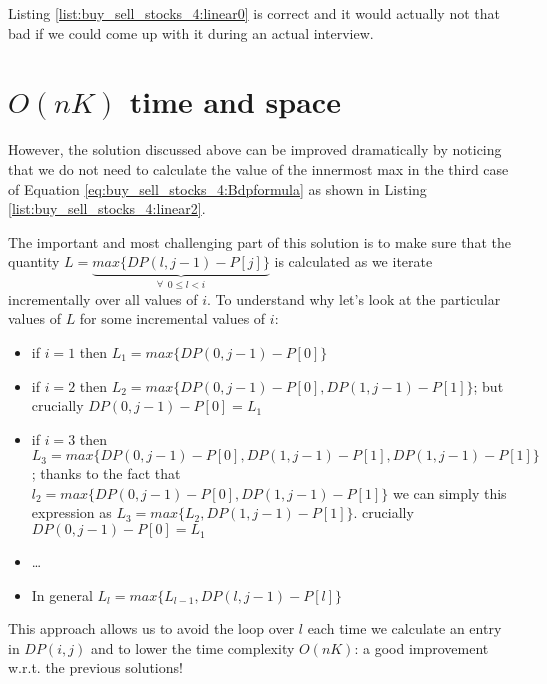 
Listing \ref{list:buy_sell_stocks_4:linear0} is correct and it would actually not that bad if we could come up with it during an actual interview. 

\section{$O(nK)$ time and space}
\label{buy_sell_stocks4:sec:linerartime1}
However, the solution discussed above can be improved dramatically by noticing that we do not need to calculate the value of the innermost max in the third case of Equation \ref{eq:buy_sell_stocks_4:Bdpformula} as shown in Listing \ref{list:buy_sell_stocks_4:linear2}.



The important and most challenging part of this solution is to make sure that the quantity $L=\underbrace{max\big\{DP(l,j-1)-P[j]\big\}}_{\forall \: \: 0 \leq l < i}$ is calculated as we iterate incrementally over all values of $i$. 
To understand why let's look at the particular values of $L$ for some incremental values of $i$:
\begin{itemize}
    \item if $i=1$ then $L_1=max\big\{DP(0,j-1)-P[0]\big\}$
    \item if $i=2$ then $L_2=max\big\{DP(0,j-1)-P[0],DP(1,j-1)-P[1]\big\}$; but crucially $DP(0,j-1)-P[0] = L_1$
    \item if $i=3$ then $L_3=max\big\{DP(0,j-1)-P[0],DP(1,j-1)-P[1],DP(1,j-1)-P[1]\big\}$; thanks to the fact that $l_2 = max \{DP(0,j-1)-P[0],DP(1,j-1)-P[1]\}$ we can simply this expression as  $L_3=max\big\{L_2,DP(1,j-1)-P[1]\big\}$.
     crucially $DP(0,j-1)-P[0] = L_1$
     \item \ldots
     \item In general $L_l = max\big\{L_{l-1}, DP(l,j-1)-P[l]\big\}$
\end{itemize}

This approach allows us to avoid the loop over $l$ each time we calculate an entry in $DP(i,j)$ and to lower the time complexity $O(nK)$: a good improvement w.r.t. the previous solutions!


